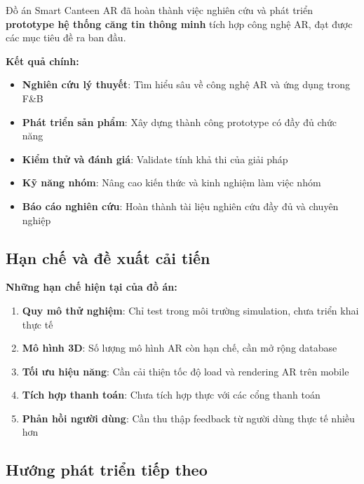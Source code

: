 \documentclass[12pt,a4paper]{article}
\begin{document}
\begin{tcolorbox}[colback=blue!5!white,colframe=darkblue,title=\textbf{Thành quả đạt được}]
Đồ án Smart Canteen AR đã hoàn thành việc nghiên cứu và phát triển \textbf{prototype hệ thống căng tin thông minh} tích hợp công nghệ AR, đạt được các mục tiêu đề ra ban đầu.

\textbf{Kết quả chính:}
\begin{itemize}[leftmargin=0.5cm]
    \item \textbf{Nghiên cứu lý thuyết}: Tìm hiểu sâu về công nghệ AR và ứng dụng trong F\&B
    \item \textbf{Phát triển sản phẩm}: Xây dựng thành công prototype có đầy đủ chức năng
    \item \textbf{Kiểm thử và đánh giá}: Validate tính khả thi của giải pháp
    \item \textbf{Kỹ năng nhóm}: Nâng cao kiến thức và kinh nghiệm làm việc nhóm
    \item \textbf{Báo cáo nghiên cứu}: Hoàn thành tài liệu nghiên cứu đầy đủ và chuyên nghiệp
\end{itemize}
\end{tcolorbox}

\subsection{Hạn chế và đề xuất cải tiến}

\textbf{Những hạn chế hiện tại của đồ án:}

\begin{enumerate}
    \item \textbf{Quy mô thử nghiệm}: Chỉ test trong môi trường simulation, chưa triển khai thực tế
    \item \textbf{Mô hình 3D}: Số lượng mô hình AR còn hạn chế, cần mở rộng database
    \item \textbf{Tối ưu hiệu năng}: Cần cải thiện tốc độ load và rendering AR trên mobile
    \item \textbf{Tích hợp thanh toán}: Chưa tích hợp thực với các cổng thanh toán
    \item \textbf{Phản hồi người dùng}: Cần thu thập feedback từ người dùng thực tế nhiều hơn
\end{enumerate}

\subsection{Hướng phát triển tiếp theo}
\end{document}
